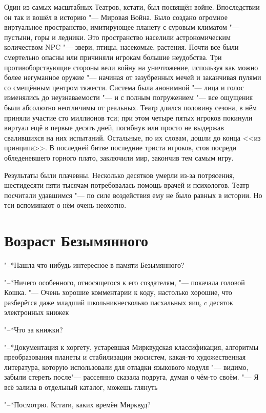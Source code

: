Один из самых масштабных Театров, кстати, был посвящён войне.
Впоследствии он так и вошёл в историю "--- Мировая Война.
Было создано огромное виртуальное пространство, имитирующее планету с суровым климатом "--- пустыни, горы и ледники.
Это пространство населили астрономическим количеством NPC "--- звери, птицы, насекомые, растения.
Почти все были смертельно опасны или причиняли игрокам большие неудобства.
Три противоборствующие стороны вели войну на уничтожение, используя как можно более негуманное оружие "--- начиная от зазубренных мечей и заканчивая пулями со смещённым центром тяжести.
Система была анонимной "--- лица и голос изменялись до неузнаваемости "--- и с полным погружением "--- все ощущения были абсолютно неотличимы от реальных.
Театр длился половину сезона, в нём приняли участие сто миллионов тси;
при этом четыре пятых игроков покинули виртуал ещё в первые десять дней, погибнув или просто не выдержав свалившихся на них испытаний.
Остальные, по их словам, дошли до конца <<из принципа>>.
В последней битве последние триста игроков, стоя посреди обледеневшего горного плато, заключили мир, закончив тем самым игру.

Результаты были плачевны.
Несколько десятков умерли из-за потрясения, шестидесяти пяти тысячам потребовалась помощь врачей и психологов.
Театр посчитали удавшимся "--- по силе воздействия ему не было равных в истории.
Но тси вспоминают о нём очень неохотно.

\section{Возраст Безымянного}

"--*Нашла что-нибудь интересное в памяти Безымянного?

"--*Ничего особенного, относящегося к его создателям, "--- покачала головой Кошка.
"--- Очень хорошие комментарии к коду, настолько хорошие, что разберётся даже младший школьник\ldotst несколько пасхальных яиц, c десяток электронных книжек\ldotst

"--*Что за книжки?

"--*Документация к хоргету, устаревшая Мирквудская классификация, алгоритмы преобразования планеты и стабилизации экосистем, какая-то художественная литература, которую использовали для отладки языкового модуля "--- видимо, забыли стереть после\ldotst "--- рассеянно сказала подруга, думая о чём-то своём.
"--- Я всё залила в отдельный каталог, можешь глянуть\ldotst

"--*Посмотрю.
Кстати, каких времён Мирквуд?

